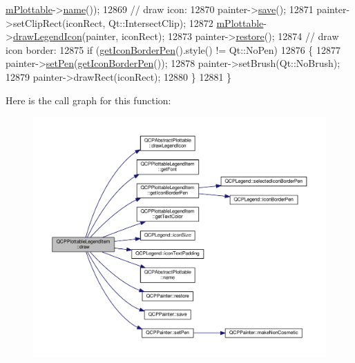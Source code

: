 \begin{DoxyCode}
      \hyperlink{class_q_c_p_plottable_legend_item_ada647fb4b22971a1a424e15b4f6af0d9}{mPlottable}->\hyperlink{class_q_c_p_abstract_plottable_a1affc1972938e4364a9325e4e4e4dcea}{name}());
12869   \textcolor{comment}{// draw icon:}
12870   painter->\hyperlink{class_q_c_p_painter_a8fd6821ee6fecbfa04444c9062912abd}{save}();
12871   painter->setClipRect(iconRect, Qt::IntersectClip);
12872   \hyperlink{class_q_c_p_plottable_legend_item_ada647fb4b22971a1a424e15b4f6af0d9}{mPlottable}->\hyperlink{class_q_c_p_abstract_plottable_a9a450783fd9ed539e589999fd390cdf7}{drawLegendIcon}(painter, iconRect);
12873   painter->\hyperlink{class_q_c_p_painter_a64908e6298d5bbd83457dc987cc3a022}{restore}();
12874   \textcolor{comment}{// draw icon border:}
12875   \textcolor{keywordflow}{if} (\hyperlink{class_q_c_p_plottable_legend_item_ab36270e6b022a6961fa44136f35c0e4b}{getIconBorderPen}().style() != Qt::NoPen)
12876   \{
12877     painter->\hyperlink{class_q_c_p_painter_af9c7a4cd1791403901f8c5b82a150195}{setPen}(\hyperlink{class_q_c_p_plottable_legend_item_ab36270e6b022a6961fa44136f35c0e4b}{getIconBorderPen}());
12878     painter->setBrush(Qt::NoBrush);
12879     painter->drawRect(iconRect);
12880   \}
12881 \}
\end{DoxyCode}


Here is the call graph for this function\+:\nopagebreak
\begin{figure}[H]
\begin{center}
\leavevmode
\includegraphics[width=350pt]{class_q_c_p_plottable_legend_item_a68a781c3de4f9959fdf82075052d43aa_cgraph}
\end{center}
\end{figure}


